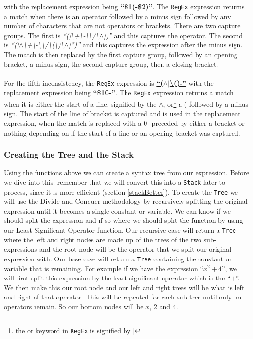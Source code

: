 \documentclass[../../../../../main.tex]{subfiles}
\begin{document}
with the replacement expression being \textbf{\underline{``\$1(-\$2)''}}. The \texttt{RegEx} expression returns a match when there is an operator followed by a minus sign followed by any number of characters that are not operators or brackets. There are two capture groups. The first is \textit{``([\textbackslash+\textbackslash-\textbackslash*\textbackslash/\textbackslash$\wedge$])''} and this captures the operator. The second is \textit{``([$\wedge$\textbackslash+\textbackslash-\textbackslash*\textbackslash/\textbackslash(\textbackslash)\textbackslash$\wedge$]*)''} and this captures the expression after the minus sign. The match is then replaced by the first capture group, followed by an opening bracket, a minus sign, the second capture group, then a closing bracket.\\ \\
For the fifth inconsistency, the \texttt{RegEx} expression is
\textbf{\underline{``($\wedge$$|$\textbackslash()-''}}
with the replacement expression being \textbf{\underline{``\$10-''}}. The \texttt{RegEx} expression returns a match when it is either the start of a line, signified by the $\wedge$, or\footnote{the or keyword in \texttt{RegEx} is signified by $|$} a ( followed by a minus sign. The start of the line of bracket is captured and is used in the replacement expression, when the match is replaced with a 0- preceded by either a bracket or nothing depending on if the start of a line or an opening bracket was captured.
\newpage
\subsubsection{Creating the Tree and the Stack}
Using the functions above we can create a syntax tree from our expression. Before we dive into this, remember that we will convert this into a \texttt{Stack} later to process, since it is more efficient (section \ref{stackBetter}). To create the \texttt{Tree} we will use the Divide and Conquer methodology by recursively splitting the original expression until it becomes a single constant or variable. We can know if we should split the expression and if so where we should split the function by using our Least Significant Operator function. Our recursive case will return a \texttt{Tree} where the left and right nodes are made up of the trees of the two sub-expressions and the root node will be the operator that we split our original expression with. Our base case will return a \texttt{Tree} containing the constant or variable that is remaining. For example if we have the expression ``$x^2 + 4$'', we will first split this expression by the least significant operator which is the ``$+$''. We then make this our root node and our left and right trees will be what is left and right of that operator. This will be repeated for each sub-tree until only no operators remain. So our bottom nodes will be $x$, 2 and 4.
\end{document}
